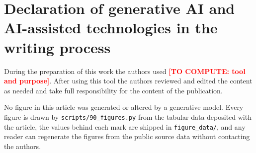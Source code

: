 \documentclass[11pt,a4paper]{article}
\newcommand{\pending}[1]{\textcolor{red}{\textbf{[TO COMPUTE: #1]}}}
\begin{document}
\section*{Declaration of generative AI and AI-assisted technologies
in the writing process}
During the preparation of this work the authors used
\pending{tool and purpose}. After using this tool the authors reviewed and
edited the content as needed and take full responsibility for the content of
the publication.

No figure in this article was generated or altered by a generative model. Every
figure is drawn by \texttt{scripts/90\_figures.py} from the tabular data
deposited with the article, the values behind each mark are shipped in
\texttt{figure\_data/}, and any reader can regenerate the figures from the
public source data without contacting the authors.



\end{document}
